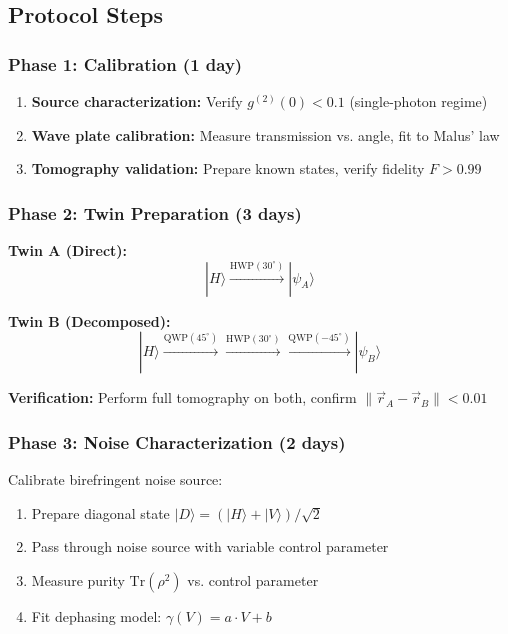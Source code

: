 \documentclass[11pt, onecolumn, letterpaper]{article}
\begin{document}
\subsection{Protocol Steps}

\subsubsection{Phase 1: Calibration (1 day)}
\begin{enumerate}
    \item \textbf{Source characterization:} Verify $g^{(2)}(0) < 0.1$ (single-photon regime)
    \item \textbf{Wave plate calibration:} Measure transmission vs. angle, fit to Malus' law
    \item \textbf{Tomography validation:} Prepare known states, verify fidelity $F > 0.99$
\end{enumerate}

\subsubsection{Phase 2: Twin Preparation (3 days)}
\textbf{Twin A (Direct):}
\begin{equation}
|H\rangle \xrightarrow{\text{HWP}(30^\circ)} |\psi_A\rangle
\end{equation}

\textbf{Twin B (Decomposed):}
\begin{equation}
|H\rangle \xrightarrow{\text{QWP}(45^\circ)} \xrightarrow{\text{HWP}(30^\circ)} \xrightarrow{\text{QWP}(-45^\circ)} |\psi_B\rangle
\end{equation}

\textbf{Verification:} Perform full tomography on both, confirm $\|\vec{r}_A - \vec{r}_B\| < 0.01$

\subsubsection{Phase 3: Noise Characterization (2 days)}
Calibrate birefringent noise source:
\begin{enumerate}
    \item Prepare diagonal state $|D\rangle = (|H\rangle + |V\rangle)/\sqrt{2}$
    \item Pass through noise source with variable control parameter
    \item Measure purity $\text{Tr}(\rho^2)$ vs. control parameter
    \item Fit dephasing model: $\gamma(V) = a \cdot V + b$
\end{enumerate}
\end{document}
